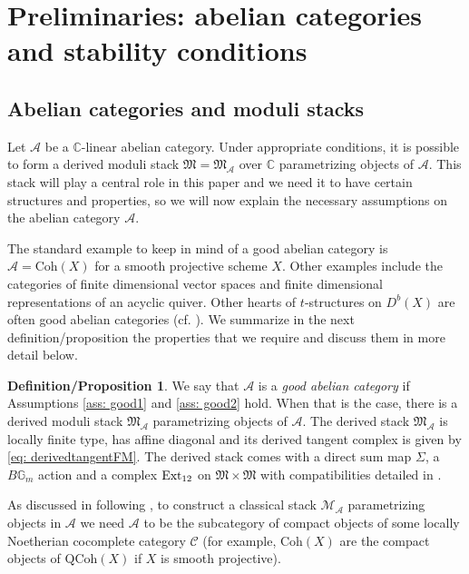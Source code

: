 \documentclass[12pt]{amsart}
\theoremstyle{definition}
\newtheorem{defprop}[definition]{Definition/Proposition}
\newcommand{\BC}{{\mathbb{C}}}
\newcommand{\BG}{{\mathbb{G}}}
\newcommand{\CA}{{\mathcal A}}
\newcommand{\CC}{{\mathcal C}}
\newcommand{\CM}{{\mathcal M}}
\newcommand{\1}{\mathbf 1}
\newcommand{\FM}{{\mathfrak{M}}}
\newcommand{\Ext}{\mathcal{E}\text{xt}}
\newcommand{\Coh}{\mathrm{Coh}}
\newcommand{\QCoh}{\mathrm{QCoh}}
\renewcommand{\Ext}{\textup{Ext}}
\begin{document}
\section{Preliminaries: abelian categories and stability conditions}
\label{sec: abeliancats}

\subsection{Abelian categories and moduli stacks}\label{subsec: abcat}



Let $\CA$ be a $\BC$-linear abelian category. Under appropriate conditions, it is possible to form a derived moduli stack $\FM=\FM_{\CA}$ over $\BC$ parametrizing objects of $\CA$. This stack will play a central role in this paper and we need it to have certain structures and properties, so we will now explain the necessary assumptions on the abelian category $\CA$.

The standard example to keep in mind of a good abelian category is $\CA=\Coh(X)$ for a smooth projective scheme $X$. Other examples include the categories of finite dimensional vector spaces and finite dimensional representations of an acyclic quiver. Other hearts of $t$-structures on $D^b(X)$ are often good abelian categories (cf. \cite[Example 7.22, 7.26]{AHLH}). We summarize in the next definition/proposition the properties that we require and discuss them in more detail below.

\begin{defprop}\label{defprop: goodabelian}
    We say that $\CA$ is a \emph{good abelian category} if Assumptions \ref{ass: good1} and \ref{ass: good2} hold. When that is the case, there is a derived moduli stack $\FM_\CA$ parametrizing objects of $\CA$. The derived stack $\FM_{\CA}$ is locally finite type, has affine diagonal and its derived tangent complex is given by \eqref{eq: derivedtangentFM}. The derived stack comes with a direct sum map $\Sigma$, a $B\BG_m$ action and a complex $\Ext_{12}$ on $\FM\times \FM$ with compatibilities detailed in \cite[Assumption 4.4 (c), (f)]{joyce}.
\end{defprop}

As discussed in \cite[Section 7.1]{AHLH} following \cite{AZ}, to construct a classical stack $\CM_\CA$ parametrizing objects in $\CA$ we need $\CA$ to be the subcategory of compact objects of some locally Noetherian cocomplete category $\CC$ (for example, $\Coh(X)$ are the compact objects of $\QCoh(X)$ if $X$ is smooth projective). 
\end{document}
